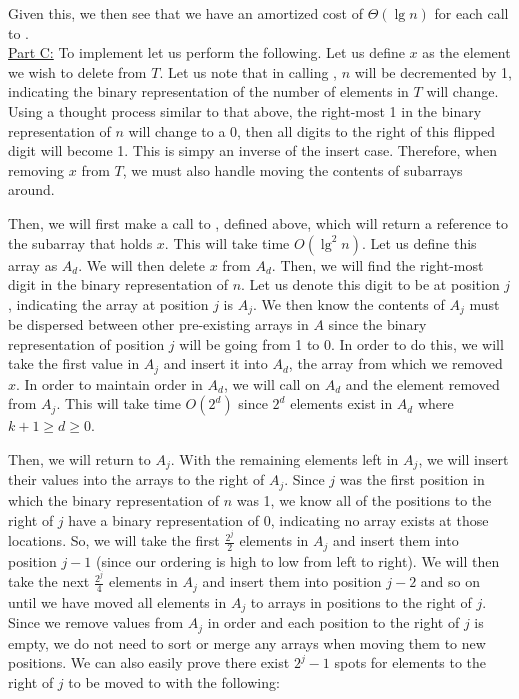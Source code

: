 \documentclass[11pt]{article}
\begin{document}
Given this, we then see that we have an amortized cost of $\Theta(\lg{n})$ for each call to .\\


\underline{Part C:} To implement  let us perform the following. Let us define $x$ as the element we wish to delete from $T$. Let us note that in calling , $n$ will be decremented by 1, indicating the binary representation of the number of elements in $T$ will change. Using a thought process similar to that above, the right-most 1 in the binary representation of $n$ will change to a 0, then all digits to the right of this flipped digit will become 1. This is simpy an inverse of the insert case. Therefore, when removing $x$ from $T$, we must also handle moving the contents of subarrays around.

Then, we will first make a call to , defined above, which will return a reference to the subarray that holds $x$. This will take time $O(\lg^2{n})$. Let us define this array as $A_d$. We will then delete $x$ from $A_d$. Then, we will find the right-most digit in the binary representation of $n$. Let us denote this digit to be at position $j$, indicating the array at position $j$ is $A_j$. We then know the contents of $A_j$ must be dispersed between other pre-existing arrays in $A$ since the binary representation of position $j$ will be going from 1 to 0. In order to do this, we will take the first value in $A_j$ and insert it into $A_d$, the array from which we removed $x$. In order to maintain order in $A_d$, we will call  on $A_d$ and the element removed from $A_j$. This will take time $O(2^d)$ since $2^d$ elements exist in $A_d$ where $k+1 \geq d \geq 0$.

Then, we will return to $A_j$. With the remaining elements left in $A_j$, we will insert their values into the arrays to the right of $A_j$. Since $j$ was the first position in which the binary representation of $n$ was 1, we know all of the positions to the right of $j$ have a binary representation of 0, indicating no array exists at those locations. So, we will take the first $\frac{2^j}{2}$ elements in $A_j$ and insert them into position $j-1$ (since our ordering is high to low from left to right). We will then take the next $\frac{2^j}{4}$ elements in $A_j$ and insert them into position $j-2$ and so on until we have moved all elements in $A_j$ to arrays in positions to the right of $j$. Since we remove values from $A_j$ in order and each position to the right of $j$ is empty, we do not need to sort or merge any arrays when moving them to new positions. We can also easily prove there exist $2^j - 1$ spots for elements to the right of $j$ to be moved to with the following:
\end{document}
